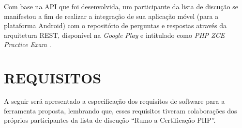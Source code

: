 Com base na \acs{API} que foi desenvolvida, um participante da lista de discução
se manifestou a fim de realizar a integração de sua aplicação móvel (para a
plataforma Android) com o repositório de perguntas e respostas através da arquitetura
\ac{REST}, disponível na \textit{Google Play} e intitulado como \textit{PHP ZCE
Practice Exam} \cite{googlePlayPHPZCEPracticeExam}.

\section{REQUISITOS}

A seguir será apresentado a especificação dos requisitos de software para a
ferramenta proposta, lembrando que, esses requisitos tiveram colaborações dos
próprios participantes da lista de discução ``Rumo a Certificação PHP''.

